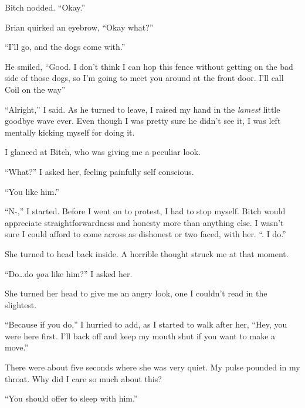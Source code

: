 Bitch nodded.  ``Okay.''



Brian quirked an eyebrow, ``Okay what?''



``I'll go, and the dogs come with.''



He smiled, ``Good.  I don't think I can hop this fence without getting on the bad side of those dogs, so I'm going to meet you around at the front door.  I'll call Coil on the way''



``Alright,'' I said.  As he turned to leave, I raised my hand in the \emph{lamest} little goodbye wave ever.  Even though I was pretty sure he didn't see it, I was left mentally kicking myself for doing it.



I glanced at Bitch, who was giving me a peculiar look.



``What?'' I asked her, feeling painfully self conscious.



``You like him.''



``N-,'' I started.  Before I went on to protest, I had to stop myself.  Bitch would appreciate straightforwardness and honesty more than anything else.  I wasn't sure I could afford to come across as dishonest or two faced, with her.  ``\ldotsYeah.  I do.''



She turned to head back inside.  A horrible thought struck me at that moment.



``Do\ldots do \emph{you} like him?'' I asked her.



She turned her head to give me an angry look, one I couldn't read in the slightest.



``Because if you do,'' I hurried to add, as I started to walk after her, ``Hey, you were here first.  I'll back off and keep my mouth shut if you want to make a move.''



There were about five seconds where she was very quiet.  My pulse pounded in my throat.  Why did I care so much about this?



``You should offer to sleep with him.''



